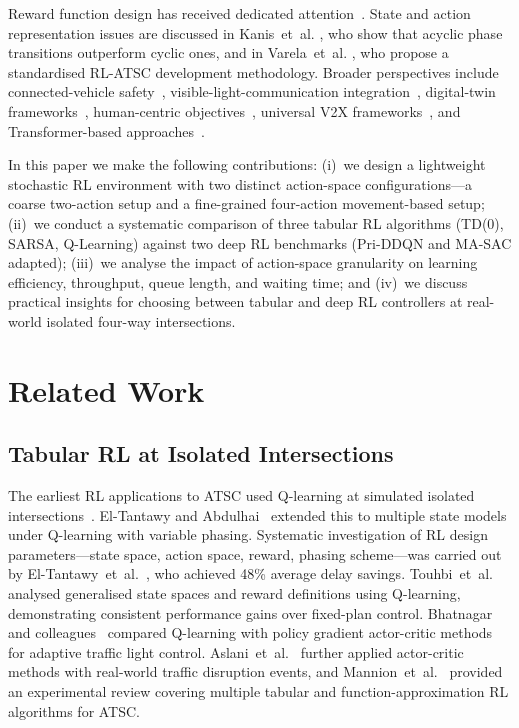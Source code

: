 \documentclass[conference]{IEEEtran}
\begin{document}
Reward function design has received dedicated
attention~\cite{Touhbi2017AdaptiveTSM, Egea2020AssessmentORW,
Aslani2018ContinuousRRZ,Lee2022EffectsAOBK}. State and action
representation issues are discussed in Kanis~et~al.
\cite{Kanis2021BackTBO}, who show that acyclic phase transitions
outperform cyclic ones, and in Varela~et~al.
\cite{Varela2021AMFX}, who propose a standardised RL-ATSC
development methodology. Broader perspectives include
connected-vehicle safety~\cite{Karbasi2024ExploringTIF},
visible-light-communication
integration~\cite{Vieira2024EnhancingUIAC},
digital-twin frameworks~\cite{Bagabaldo2025DigitalTFS},
human-centric objectives~\cite{Vlachogiannis2023HumanLightIRI},
universal V2X frameworks~\cite{Wang2023UniTSAAUAE}, and
Transformer-based approaches~\cite{Zhao2024SequenceDTAH}.

In this paper we make the following contributions: (i)~we design a
lightweight stochastic RL environment with two distinct
action-space configurations---a coarse two-action setup and a
fine-grained four-action movement-based setup; (ii)~we conduct a
systematic comparison of three tabular RL algorithms
(TD(0), SARSA, Q-Learning) against two deep RL benchmarks
(Pri-DDQN and MA-SAC adapted); (iii)~we analyse the impact of
action-space granularity on learning efficiency, throughput, queue
length, and waiting time; and (iv)~we discuss practical insights
for choosing between tabular and deep RL controllers at real-world
isolated four-way intersections.

\section{Related Work}

\subsection{Tabular RL at Isolated Intersections}

The earliest RL applications to ATSC used Q-learning at simulated
isolated intersections~\cite{Abdulhai2003ReinforcementLFAD}.
El-Tantawy and Abdulhai~\cite{ElTantawy2010AnALV} extended this to
multiple state models under Q-learning with variable phasing.
Systematic investigation of RL design parameters---state space,
action space, reward, phasing scheme---was carried out by
El-Tantawy~et~al.~\cite{ElTantawy2014DesignORH}, who achieved 48\%
average delay savings. Touhbi~et~al.~\cite{Touhbi2017AdaptiveTSM}
analysed generalised state spaces and reward definitions using
Q-learning, demonstrating consistent performance gains over
fixed-plan control. Bhatnagar and
colleagues~\cite{A2011ReinforcementLWU} compared Q-learning with
policy gradient actor-critic methods for adaptive traffic light
control. Aslani~et~al.~\cite{Aslani2017AdaptiveTSAO} further
applied actor-critic methods with real-world traffic disruption
events, and Mannion~et~al.~\cite{Mannion2016AnERAP} provided an
experimental review covering multiple tabular and function-approximation
RL algorithms for ATSC.
\end{document}

